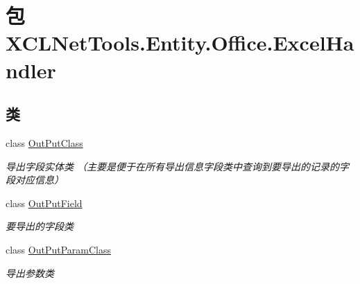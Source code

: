 \hypertarget{namespace_x_c_l_net_tools_1_1_entity_1_1_office_1_1_excel_handler}{\section{包 X\-C\-L\-Net\-Tools.\-Entity.\-Office.\-Excel\-Handler}
\label{namespace_x_c_l_net_tools_1_1_entity_1_1_office_1_1_excel_handler}
}
\subsection*{类}
\begin{DoxyCompactItemize}
\item 
class \hyperlink{class_x_c_l_net_tools_1_1_entity_1_1_office_1_1_excel_handler_1_1_out_put_class}{Out\-Put\-Class}
\begin{DoxyCompactList}\small\item\em 导出字段实体类 （主要是便于在所有导出信息字段类中查询到要导出的记录的字段对应信息） \end{DoxyCompactList}\item 
class \hyperlink{class_x_c_l_net_tools_1_1_entity_1_1_office_1_1_excel_handler_1_1_out_put_field}{Out\-Put\-Field}
\begin{DoxyCompactList}\small\item\em 要导出的字段类 \end{DoxyCompactList}\item 
class \hyperlink{class_x_c_l_net_tools_1_1_entity_1_1_office_1_1_excel_handler_1_1_out_put_param_class}{Out\-Put\-Param\-Class}
\begin{DoxyCompactList}\small\item\em 导出参数类 \end{DoxyCompactList}\end{DoxyCompactItemize}
